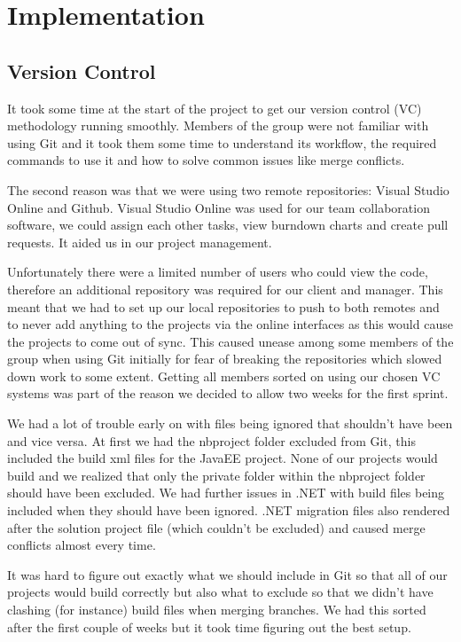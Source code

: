 \chapter{Implementation}

\section{Version Control}
It took some time at the start of the project to get our version control (VC) methodology running smoothly. Members of the group were not familiar with using Git and it took them some time to understand its workflow, the required commands to use it and how to solve common issues like merge conflicts. \par
The second reason was that we were using two remote repositories: Visual Studio Online\cite{vso} and Github\cite{Github}. Visual Studio Online was used for our team collaboration software, we could assign each other tasks, view burndown charts and create pull requests. It aided us in our project management. \par
Unfortunately there were a limited number of users who could view the code, therefore an additional repository was required for our client and manager. This meant that we had to set up our local repositories to push to both remotes and to never add anything to the projects via the online interfaces as this would cause the projects to come out of sync. This caused unease among some members of the group when using Git initially for fear of breaking the repositories which slowed down work to some extent. Getting all members sorted on using our chosen VC systems was part of the reason we decided to allow two weeks for the first sprint. \par
We had a lot of trouble early on with files being ignored that shouldn’t have been and vice versa. At first we had the nbproject folder excluded from Git, this included the build xml files for the JavaEE project. None of our projects would build and we realized that only the private folder within the nbproject folder should have been excluded. We had further issues in .NET with build files being included when they should have been ignored. .NET migration files also rendered after the solution project file (which couldn’t be excluded) and caused merge conflicts almost every time. \par
It was hard to figure out exactly what we should include in Git so that all of our projects would build correctly but also what to exclude so that we didn’t have clashing (for instance) build files when merging branches. We had this sorted after the first couple of weeks but it took time figuring out the best setup. 
